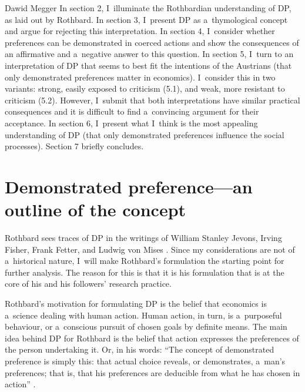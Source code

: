 \begin{artengenv}{Dawid Megger}
In section 2, I~illuminate the Rothbardian understanding of DP, as laid out by Rothbard. In section 3, I~present DP as a~thymological concept and argue for rejecting this interpretation. In section 4, I~consider whether preferences can be demonstrated in coerced actions and show the consequences of an affirmative and a~negative answer to this question. In section 5, I~turn to an interpretation of DP that seems to best fit the intentions of the Austrians (that only demonstrated preferences matter in economics). I~consider this in two variants: strong, easily exposed to criticism (5.1), and weak, more resistant to criticism (5.2). However, I~submit that both interpretations have similar practical consequences and it is difficult to find a~convincing argument for their acceptance. In section 6, I~present what I~think is the most appealing understanding of DP (that only demonstrated preferences influence the social processes). Section 7 briefly concludes.



\section{Demonstrated preference---an outline of the concept}

Rothbard sees traces of DP in the writings of William Stanley Jevons, Irving Fisher, Frank Fetter, and Ludwig von Mises 
\parencite[][p.290]{rothbard_present_2011}. %
 Since my considerations are not of a~historical nature, I~will make Rothbard's formulation the starting point for further analysis. The reason for this is that it is his formulation that is at the core of his and his followers' research practice.



Rothbard's motivation for formulating DP is the belief that economics is a~science dealing with human action. Human action, in turn, is a~purposeful behaviour, or a~conscious pursuit of chosen goals by definite means. The main idea behind DP for Rothbard is the belief that action expresses the preferences of the person undertaking it. Or, in his words: ``The concept of demonstrated preference is simply this: that actual choice reveals, or demonstrates, a~man's preferences; that is, that his preferences are deducible from what he has chosen in action'' 
\parencite[][p.290]{rothbard_present_2011}.%





\end{artengenv}
